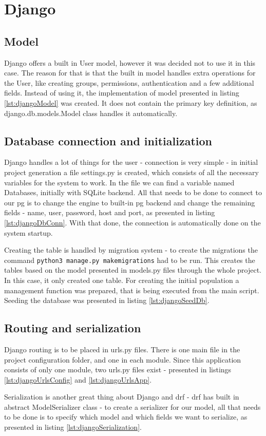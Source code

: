 %
%
\section{Django}
\subsection{Model}\label{sub:djangoModel}
Django offers a built in User model, however it was decided not to use it in this case. The reason for that is that the built in model handles extra operations for the User, like creating groups, permissions, authentication and a few additional fields. Instead of using it, the implementation of model presented in listing \ref{lst:djangoModel} was created. It does not contain the primary key definition, as django.db.models.Model class handles it automatically.


\subsection{Database connection and initialization}
Django handles a lot of things for the user - connection is very simple - in initial project generation a file settings.py is created, which consists of all the necessary variables for the system to work. In the file we can find a variable named Databases, initially with SQLite backend. All that needs to be done to connect to our \acrlong{pg} is to change the engine to built-in \acrshort{pg} backend and change the remaining fields - name, user, password, host and port, as presented in listing \ref{lst:djangoDbConn}. With that done, the connection is automatically done on the system startup.

Creating the table is handled by migration system - to create the migrations the command \lstinline[language=bash]{python3 manage.py makemigrations} had to be run.
This creates the tables based on the model presented in models.py files through the whole project. In this case, it only created one table.
For creating the initial population a management function was prepared, that is being executed from the main script. Seeding the database was presented in listing \ref{lst:djangoSeedDb}.


\subsection{Routing and serialization}
Django routing is to be placed in urls.py files. There is one main file in the project configuration folder, and one in each module. Since this application consists of only one module, two urls.py files exist - presented in listings \ref{lst:djangoUrlsConfig} and \ref{lst:djangoUrlsApp}.


Serialization is another great thing about Django and \acrlong{drf} - \acrshort{drf} has built in abstract ModelSerializer class - to create a serializer for our model, all that needs to be done is to specify which model and which fields we want to serialize, as presented in listing \ref{lst:djangoSerialization}.


